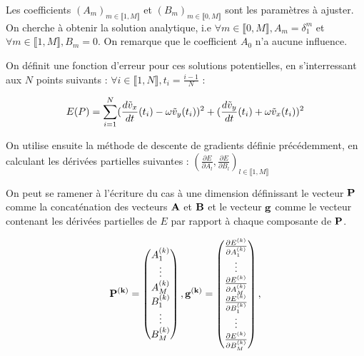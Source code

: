 \documentclass[12pt]{report}
\begin{document}
Les coefficients $(A_m)_{m\in \llbracket 1,M \rrbracket}$ et $(B_m)_{m\in \llbracket 0,M \rrbracket}$ sont les paramètres à ajuster.
On cherche à obtenir la solution analytique, i.e $\forall m \in\llbracket 0,M \rrbracket, A_m = \delta _1 ^m $ et $\forall m \in\llbracket 1,M \rrbracket, B_m = 0 $. On remarque que le coefficient $A_0$ n'a aucune influence.

On définit une fonction d'erreur pour ces solutions potentielles, en s'interressant aux $N$ points suivants : $\forall i \in\llbracket 1,N \rrbracket, t_i = \frac{i-1}{N} $ :

\begin{equation}
        E(P) = \sum_{i=1}^{N} (\frac{d\Tilde{v}_x}{dt}(t_i) - \omega \Tilde{v}_y(t_i))^2 + (\frac{d\Tilde{v}_y}{dt}(t_i) + \omega \Tilde{v}_x(t_i))^2
\label{eq:erreur descente gradient couplées}
\end{equation}

On utilise ensuite la méthode de descente de gradients définie précédemment, en calculant les dérivées partielles suivantes :
$(\frac{\partial E}{\partial A_l}, \frac{\partial E}{\partial B_l})_{l \in \llbracket 1,M \rrbracket}$

On peut se ramener à l'écriture du cas à une dimension définissant le vecteur $\bf{P}$ comme la concaténation des 
vecteurs $\bf{A}$ et $\bf{B}$ et le vecteur $\bf{g}$ comme le vecteur contenant les dérivées  partielles de $E$
par rapport à chaque composante de $\bf{P}$. 

\begin{equation}
    \bf{P}^{(k)} = \begin{pmatrix}
                A_1^{(k)} \\
                \vdots \\
                A_M^{(k)} \\
                B_1^{(k)} \\
                \vdots \\
                B_M^{(k)}
              \end{pmatrix},
    \bf{g}^{(k)} = \begin{pmatrix}
                \frac{\partial E^{(k)}}{\partial A_1^{(k)}} \\
                \vdots \\
                \frac{\partial E^{(k)}}{\partial A_M^{(k)}} \\
                \frac{\partial E^{(k)}}{\partial B_1^{(k)}} \\
                \vdots \\
                \frac{\partial E^{(k)}}{\partial B_M^{(k)}} 
              \end{pmatrix},     
\label{eq:définition descente de gradients 2D}
\end{equation}
\end{document}
